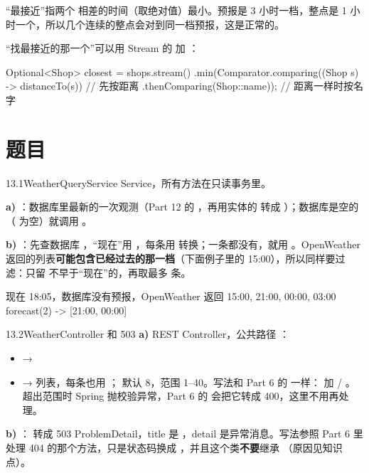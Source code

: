 “最接近”指两个  相差的时间（取绝对值）最小。预报是 3 小时一档，整点是 1 小时一个，所以几个连续的整点会对到同一档预报，这是正常的。

“找最接近的那一个”可以用 Stream 的  加 ：

\begin{java}
Optional<Shop> closest = shops.stream()
        .min(Comparator.comparing((Shop s) -> distanceTo(s))     // 先按距离
                .thenComparing(Shop::name));                     // 距离一样时按名字
\end{java}

\section{题目}

\begin{task}{13.1\quad WeatherQueryService}
Service，所有方法在只读事务里。

\textbf{a) }：数据库里最新的一次观测（Part 12 的 ，再用实体的  转成 ）；数据库是空的（ 为空）就调用 。

\textbf{b) }：先查数据库 ，“现在”用 ，每条用  转换；一条都没有，就用 。OpenWeather 返回的列表\textbf{可能包含已经过去的那一档}（下面例子里的 15:00），所以同样要过滤：只留  不早于“现在”的，再取最多  条。

\begin{example}
\begin{plaincode}
现在 18:05，数据库没有预报，OpenWeather 返回 15:00, 21:00, 00:00, 03:00
forecast(2)  ->  [21:00, 00:00]
\end{plaincode}
\end{example}
\end{task}

\begin{task}{13.2\quad WeatherController 和 503}
\textbf{a)} REST Controller，公共路径 ：
\begin{itemize}
  \item {} → 
  \item {} → 列表，每条也用 ； 默认 8，范围 1--40。写法和 Part 6 的  一样： 加  / 。超出范围时 Spring 抛校验异常，Part 6 的  会把它转成 400，这里不用再处理。
\end{itemize}

\textbf{b)} ： 转成 503 ProblemDetail，title 是 ，detail 是异常消息。写法参照 Part 6  里处理 404 的那个方法，只是状态码换成 ，并且这个类\textbf{不要}继承 （原因见知识点）。
\end{task}

